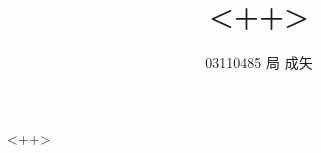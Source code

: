 \documentclass[a4paper]{jsarticle}
\title{<++>}
\author{03110485 局 成矢}
\begin{document}
\maketitle
<++>
\end{document}
